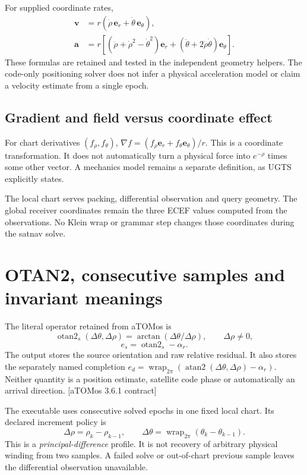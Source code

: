 \documentclass[11pt,a4paper]{article}
\newcommand{\aRef}{\textcolor{muted}{[aTOMos 3.6.1 contract]}}
\newcommand{\ot}{\operatorname{otan2}}
\newcommand{\wrap}{\operatorname{wrap}}
\begin{document}
For supplied coordinate rates,
\begin{align}
\mathbf v&=r(\dot\rho\,\mathbf e_r+\dot\theta\,\mathbf e_\theta),\\
\mathbf a&=r[(\ddot\rho+\dot\rho^2-\dot\theta^2)\mathbf e_r+
(\ddot\theta+2\dot\rho\dot\theta)\mathbf e_\theta].
\end{align}
These formulas are retained and tested in the independent geometry helpers. The code-only positioning
solver does not infer a physical acceleration model or claim a velocity estimate from a single epoch.

\subsection{Gradient and field versus coordinate effect}
For chart derivatives $(f_\rho,f_\theta)$,
$\nabla f=(f_\rho\mathbf e_r+f_\theta\mathbf e_\theta)/r$.
This is a coordinate transformation. It does not automatically turn a physical force into $e^{-\rho}$ times
some other vector. A mechanics model remains a separate definition, as UGTS explicitly states.

The local chart serves packing, differential observation and query geometry. The global receiver coordinates
remain the three ECEF values computed from the observations. No Klein wrap or grammar step changes those
coordinates during the satnav solve.
\clearpage

\section{OTAN2, consecutive samples and invariant meanings}
The literal operator retained from aTOMos is
\begin{equation}
\ot_s(\Delta\theta,\Delta\rho)=\arctan(\Delta\theta/\Delta\rho),\qquad\Delta\rho\ne0,
\end{equation}
\begin{equation}
e_s=\ot_s-\alpha_r.
\end{equation}
The output stores the source orientation and raw relative residual. It also stores the separately named
completion $e_d=\wrap_{2\pi}(\operatorname{atan2}(\Delta\theta,\Delta\rho)-\alpha_r)$. Neither quantity is a
position estimate, satellite code phase or automatically an arrival direction. \aRef

The executable uses consecutive solved epochs in one fixed local chart. Its declared increment policy is
\begin{equation}
\Delta\rho=\rho_k-\rho_{k-1},\qquad
\Delta\theta=\wrap_{2\pi}(\theta_k-\theta_{k-1}).
\end{equation}
This is a \emph{principal-difference} profile. It is not recovery of arbitrary physical winding from two samples.
A failed solve or out-of-chart previous sample leaves the differential observation unavailable.
\end{document}
